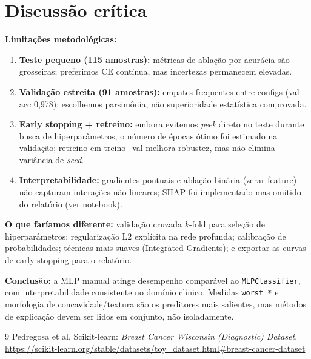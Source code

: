 \documentclass[a4paper,11pt]{article}
\begin{document}
\section{Discussão crítica}

\textbf{Limitações metodológicas:}
\begin{enumerate}
    \item \textbf{Teste pequeno (115 amostras):} métricas de ablação por acurácia são grosseiras; preferimos CE contínua, mas incertezas permanecem elevadas.
    \item \textbf{Validação estreita (91 amostras):} empates frequentes entre configs (val acc 0{,}978); escolhemos parsimônia, não superioridade estatística comprovada.
    \item \textbf{Early stopping + retreino:} embora evitemos \emph{peek} direto no teste durante busca de hiperparâmetros, o número de épocas ótimo foi estimado na validação; retreino em treino+val melhora robustez, mas não elimina variância de \emph{seed}.
    \item \textbf{Interpretabilidade:} gradientes pontuais e ablação binária (zerar feature) não capturam interações não-lineares; SHAP foi implementado mas omitido do relatório (ver notebook).
\end{enumerate}

\textbf{O que faríamos diferente:} validação cruzada $k$-fold para seleção de hiperparâmetros; regularização L2 explícita na rede profunda; calibração de probabilidades; técnicas mais suaves (Integrated Gradients); e exportar as curvas de early stopping para o relatório.

\textbf{Conclusão:} a MLP manual atinge desempenho comparável ao \texttt{MLPClassifier}, com interpretabilidade consistente no domínio clínico. Medidas \texttt{worst\_*} e morfologia de concavidade/textura são os preditores mais salientes, mas métodos de explicação devem ser lidos em conjunto, não isoladamente.

\begin{thebibliography}{9}
Pedregosa et al. Scikit-learn: \emph{Breast Cancer Wisconsin (Diagnostic) Dataset}. \url{https://scikit-learn.org/stable/datasets/toy_dataset.html#breast-cancer-dataset}
\end{thebibliography}
\end{document}

